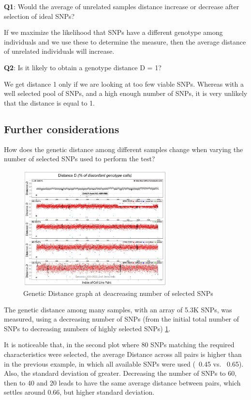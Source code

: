 \textbf{Q1}: Would the average of unrelated samples distance increase or decrease after selection of ideal SNPs?

If we maximize the likelihood that SNPs have a different genotype among individuals and we use these to determine the measure, then the average distance of unrelated individuals will increase.

\textbf{Q2}: Is it likely to obtain a genotype distance D = 1?

We get distance 1 only if we are looking at too few viable SNPs. Whereas with a well selected pool of SNPs, and a high enough number of SNPs, it is very unlikely that the distance is equal to 1.

\subsection*{Further considerations}
How does the genetic distance among different samples change when varying the number of selected SNPs used to perform the test?

\begin{figure}
	\centering
	\includegraphics[width=0.7\textwidth]{Images/Selected_SNP.PNG}
	\caption{\label{fig:sel_snp}Genetic Distance graph at deacreasing number of selected SNPs}
\end{figure}

The genetic distance among many samples, with an array of 5.3K SNPs, was measured, using a decreasing number of SNPs (from the initial total number of SNPs to decreasing numbers of highly selected SNPs) \ref{fig:sel_snp}. 

It is noticeable that, in the second plot where 80 SNPs matching the required characteristics were selected, the average Distance across all pairs is higher than in the previous example, in which all available SNPs were used (~0.45 vs. ~0.65). Also, the standard deviation of greater. 
Decreasing the number of SNPs to 60, then to 40 and 20 leads to have the same average distance between pairs, which settles around 0.66, but higher standard deviation.

